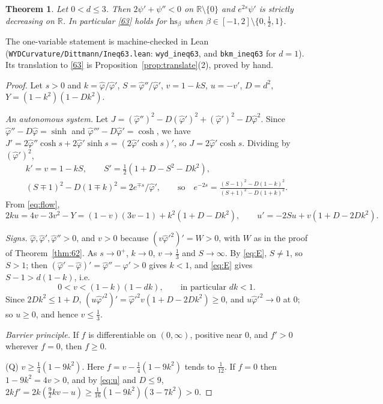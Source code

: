 \documentclass[11pt]{amsart}
\newtheorem{theorem}{Theorem}[section]
\theoremstyle{definition}
\numberwithin{equation}{section}
\newcommand{\R}{\mathbb{R}}
\newcommand{\hs}{\mathrm{hs}}
\newcommand{\ph}{\hat\varphi}
\begin{document}
\begin{theorem}\label{thm:63}
Let $0<d\le3$. Then $2\psi'+\psi''<0$ on $\R\setminus\{0\}$ and $e^{2s}\psi'$ is strictly decreasing on $\R$. In particular \eqref{63} holds for $\hs_\beta$ when $\beta\in[-1,2]\setminus\{0,\frac12,1\}$.
\end{theorem}
\noindent The one-variable statement is machine-checked in Lean (\texttt{WYDCurvature/Dittmann/Ineq63.lean}: \texttt{wyd\_ineq63}, and \texttt{bkm\_ineq63} for $d=1$). Its translation to \eqref{63} is Proposition~\ref{prop:translate}(2), proved by hand.
\begin{proof}
Let $s>0$ and $k=\ph/\ph'$, $S=\ph''/\ph'$, $v=1-kS$, $u=-v'$, $D=d^2$, $Y=(1-k^2)(1-Dk^2)$.

\emph{An autonomous system.} Let $J=(\ph'')^2-D(\ph')^2+(\ph')^2-D\ph^2$. Since $\ph''-D\ph=\sinh$ and $\ph'''-D\ph'=\cosh$, we have $J'=2\ph''\cosh s+2\ph'\sinh s=(2\ph'\cosh s)'$, so
$J=2\ph'\cosh s$. Dividing by $(\ph')^2$,
\begin{gather}
k'=v=1-kS,\qquad S'=\tfrac12(1+D-S^2-Dk^2),\label{eq:flow}\\
(S\mp1)^2-D(1\mp k)^2=2e^{\mp s}/\ph',\qquad\text{so}\quad e^{-2s}=\frac{(S-1)^2-D(1-k)^2}{(S+1)^2-D(1+k)^2}.\label{eq:E}
\end{gather}
From \eqref{eq:flow},
\begin{equation}\label{eq:u}
2ku=4v-3v^2-Y=(1-v)(3v-1)+k^2(1+D-Dk^2),\qquad u'=-2Su+v(1+D-2Dk^2).
\end{equation}

\emph{Signs.} $\ph,\ph',\ph''>0$, and $v>0$ because $(v\ph'^2)'=W>0$, with $W$ as in the proof of Theorem~\ref{thm:62}. As $s\to0^+$, $k\to0$, $v\to\frac13$ and $S\to\infty$. By \eqref{eq:E}, $S\ne1$, so $S>1$; then
$(\ph'-\ph)'=\ph''-\ph'>0$ gives $k<1$, and \eqref{eq:E} gives $S-1>d(1-k)$, i.e.
\begin{equation}\label{eq:vup}
0<v<(1-k)(1-dk),\qquad\text{in particular } dk<1.
\end{equation}
Since $2Dk^2\le1+D$, $(u\ph'^2)'=\ph'^2v(1+D-2Dk^2)\ge0$, and $u\ph'^2\to0$ at $0$; so $u\ge0$, and hence $v\le\frac13$.

\emph{Barrier principle.} If $f$ is differentiable on $(0,\infty)$, positive near $0$, and $f'>0$ wherever $f=0$, then $f\ge0$.

(Q) $v\ge\frac14(1-9k^2)$. Here $f=v-\frac14(1-9k^2)$ tends to $\frac1{12}$. If $f=0$ then $1-9k^2=4v>0$, and by \eqref{eq:u} and $D\le9$, $2kf'=2k(\frac92kv-u)\ge\frac1{16}(1-9k^2)(3-7k^2)>0$.


\end{proof}
\end{document}
